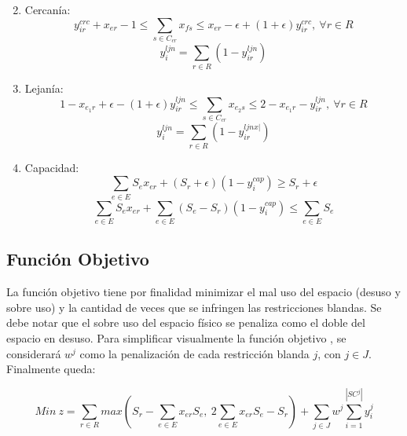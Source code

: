 \documentclass[letter, 10pt]{article}
\begin{document}
\begin{enumerate}
\begin{equation}
    \end{equation}
    \item Cercan\'ia:
    \begin{equation}
        y_{ir}^{crc} + x_{er} - 1 \leq \sum_{s \in C_{cr}} x_{fs} \leq x_{er} - \epsilon + (1 + \epsilon) y_{ir}^{crc}, \ \forall r \in R 
    \end{equation}
    \begin{equation}
        y_{i}^{ljn} = \sum_{r \in R} (1-y_{ir}^{ljn})
    \end{equation}
    \item Lejan\'ia:
    \begin{equation}
        1 - x_{e_1r} + \epsilon - (1 + \epsilon) y_{ir}^{ljn} \leq \sum_{s \in C_{cr}} x_{e_2s} \leq 2 - x_{e_1r} - y_{ir}^{ljn}, \ \forall r \in R 
    \end{equation}
    \begin{equation}
        y_{i}^{ljn} = \sum_{r \in R} (1-y_{ir}^{ljnx|})
    \end{equation}
    \item Capacidad: 
    \begin{equation}
        \sum_{e \in E } S_{e}x_{er} + (S_r + \epsilon) (1 - y_{i}^{cap}) \geq S_r + \epsilon 
    \end{equation}
    \begin{equation}
        \sum_{e \in E } S_{e}x_{er} + \sum_{e \in E}(S_e - S_r) (1 - y_{i}^{cap}) \leq \sum_{e \in E} S_e
        \end{equation}
\end{enumerate}
\subsection{Funci\'on Objetivo}

La funci\'on objetivo tiene por finalidad minimizar el mal uso del espacio (desuso y sobre uso) y la cantidad de veces que se infringen las restricciones blandas. Se debe notar que el sobre uso del espacio f\'isico se penaliza como el doble del espacio en desuso. Para simplificar visualmente la funci\'on objetivo \cite{USM}, se considerar\'a $w^j$ como la penalizaci\'on de cada restricci\'on blanda $j$, con $j \in J$.
Finalmente queda:

\begin{equation}
    Min \ z = \sum_{r \in R} max(S_r - \sum_{e \in E} x_{er}S_e, \ 2 \sum_{e \in E}x_{er}S_e - S_r) + \sum_{j \in J}w^j \sum_{i=1}^{|SC^j|}y_{i}^j 
\end{equation}
\end{document}

